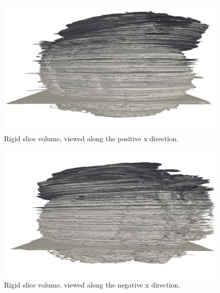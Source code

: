 	\begin{figure}
	  \centering
	  \includegraphics[width=0.9\textheight]{Ch6/Figs/Rat28/contours/whole_positive_x_rigid}
	  \caption{Rigid slice volume, viewed along the positive x direction.}
	  \label{fig:positive_x_rigid_contour}
	\end{figure}

	\begin{figure}
	  \centering
	  \includegraphics[width=0.9\textheight]{Ch6/Figs/Rat28/contours/whole_negative_x_rigid}
	  \caption{Rigid slice volume, viewed along the negative x direction.}
	  \label{fig:negative_x_rigid_contour}
	\end{figure}

